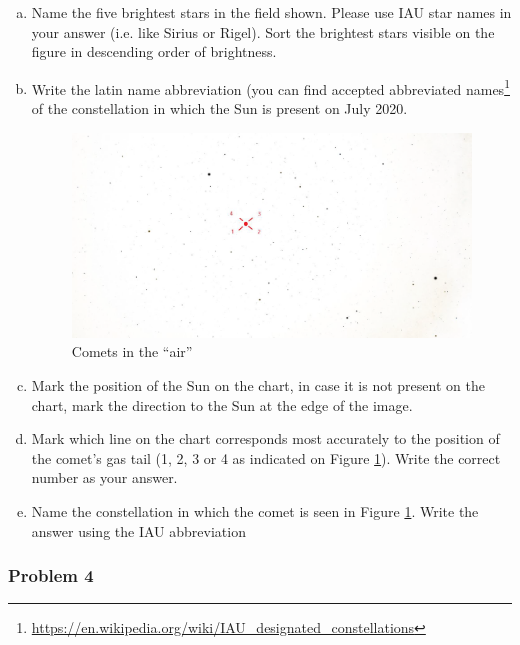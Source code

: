 \documentclass[a4paper,12pt]{extarticle}
\begin{document}
\begin{enumerate}[a.]
    \item Name the five brightest stars in the field shown. Please use IAU star names in your answer (i.e. like Sirius or Rigel). Sort the brightest stars visible on the figure in descending order of brightness.
    \item Write the latin name abbreviation (you can find accepted abbreviated names\footnote{\url{https://en.wikipedia.org/wiki/IAU_designated_constellations}} of the constellation in which the Sun is present on  July 2020.
    
\begin{figure}[H]
    \centering
    \includegraphics[width=0.95\linewidth]{GeCAA_1.png}
    \caption{Comets in the “air”}
    \label{GeCAA_1}
\end{figure}
    \item Mark the position of the Sun on the chart, in case it is not present on the chart, mark the direction to the Sun at the edge of the image.
    \item Mark which line on the chart corresponds most accurately to the position of the comet’s gas tail (1, 2, 3 or 4 as indicated on Figure \ref{GeCAA_1}). Write the correct number as your answer.
    \item Name the constellation in which the comet is seen in Figure \ref{GeCAA_1}. Write the answer using the IAU abbreviation
\end{enumerate}
\subsubsection{Problem 4}
\end{document}
